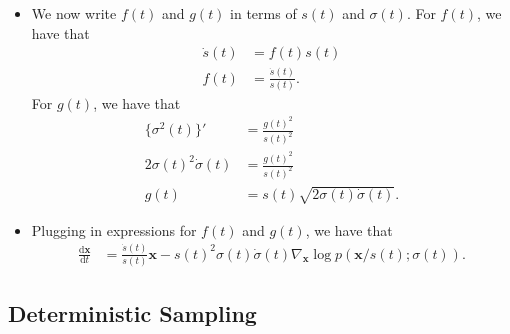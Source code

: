 \documentclass[10pt]{article}
\newcommand{\dee}{\mathrm{d}}
\newcommand{\ve}[1]{\mathbf{#1}}
\begin{document}
\begin{itemize}
  \item We now write $f(t)$ and $g(t)$ in terms of $s(t)$ and $\sigma(t)$.  For $f(t)$, we have that
  \begin{align*}
    \dot{s}(t) &= f(t) s(t) \\
    f(t) &= \frac{\dot{s}(t)}{s(t)}.
  \end{align*}
  For $g(t)$, we have that
  \begin{align*}
    \{ \sigma^2(t) \}' &= \frac{g(t)^2}{s(t)^2} \\
    2\sigma(t)^2 \dot{\sigma}(t) &= \frac{g(t)^2}{s(t)^2} \\
    g(t) &= s(t) \sqrt{2 \sigma(t) \dot{\sigma}(t)}.
  \end{align*}

  \item Plugging in expressions for $f(t)$ and $g(t)$, we have that
  \begin{align}
    \frac{\dee \ve{x}}{\dee t}
    &= \frac{\dot{s}(t)}{s(t)} \ve{x} - s(t)^2 \sigma(t) \dot{\sigma}(t) \nabla_{\ve{x}} \log p(\ve{x}/s(t); \sigma(t)). \label{eqn:scaled-probability-flow-ode}
  \end{align}
\end{itemize}

\subsection{Deterministic Sampling}
\end{document}
